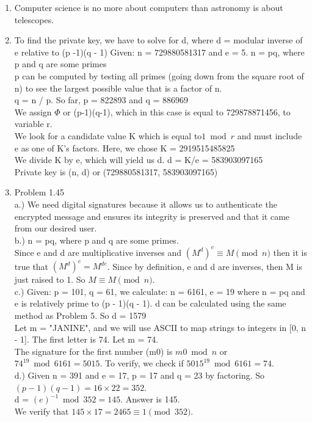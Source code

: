 \documentclass{article}
\begin{document}
\begin{enumerate}
	\item
		Computer science is no more about computers than astronomy is about telescopes.
	\item
		To find the private key, we have to solve for d, where d = modular inverse of e relative to (p -1)(q - 1)
		Given: n = 729880581317 and e = 5. n = pq, where p and q are some primes\\
		p can be computed by testing all primes (going down from the square root of n) to see the largest possible value that 			is a factor of n.\\
		q = n / p. So far, p = 822893 and q = 886969\\
		We assign $\Phi$ or (p-1)(q-1), which in this case is equal to 729878871456, to variable r.\\
		We look for a candidate value K which is equal to$1 \bmod r$ and must include e as one of K's factors. Here, we chose K = 2919515485825\\
		We divide K by e, which will yield us d.  d = K/e = 583903097165\\
		Private key is (n, d) or (729880581317, 583903097165)
	\item
		Problem 1.45\\
		a.) We need digital signatures because it allows us to authenticate the encrypted message and ensures its integrity is preserved and that it came from our desired user.\\
		b.) n = pq, where p and q are some primes. \\
		Since e and d are multiplicative inverses and $(M^d)^e \equiv M \pmod n$ then it is true that $(M^d)^e = M^{de}$. Since by definition, e and d are inverses, then M is just raised to 1. So $M \equiv M \pmod n.$\\
		c.) Given: p = 101, q = 61, we calculate: n = 6161, e = 19 where n = pq and e is relatively prime to (p - 1)(q - 1). d can be calculated using the same method as Problem 5. So d = 1579\\
		   Let m = "JANINE", and we will use ASCII to map strings to integers in [0, n - 1]. The first letter is 74. Let m = 74.\\
		   The signature for the first number (m0) is $m0 \bmod n$ or $74^{19} \bmod 6161 = 5015$.  To verify, we check if $5015^{19} \bmod 6161 = 74$.\\
		d.) Given n = 391 and e = 17, p = 17 and q = 23 by factoring. So $(p-1)(q-1)  = 16 \times 22 = 352$.\\ d = $(e)^{-1} \bmod 352 = 145$. Answer is 145.\\
		    We verify that $145 \times 17 = 2465 \equiv 1 \pmod {352}$.


\end{enumerate}
\end{document}
